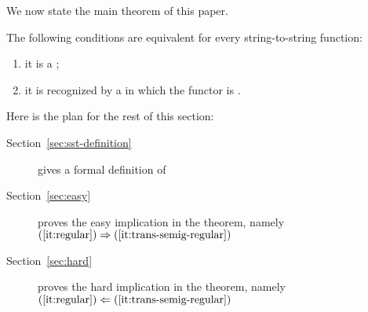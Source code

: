 We now state the main theorem of this paper. 


\begin{theorem}\label{thm:regular-functions}
    The following conditions are equivalent for every string-to-string function:
    \begin{enumerate}
        \item \label{it:regular} it is a ;
        \item \label{it:trans-semig-regular}it is recognized by a   in which the functor is . 
    \end{enumerate}
\end{theorem}

\noindent Here is the plan for the rest of this section:
\begin{description}
    \item[Section~\ref{sec:sst-definition}] gives a formal definition of 
    \item[Section~\ref{sec:easy}] proves the easy  implication in the theorem, namely  $(\ref{it:regular}) \Rightarrow (\ref{it:trans-semig-regular})$
    \item[Section~\ref{sec:hard}] proves the hard  implication in the theorem, namely  $(\ref{it:regular}) \Leftarrow (\ref{it:trans-semig-regular})$
\end{description}

